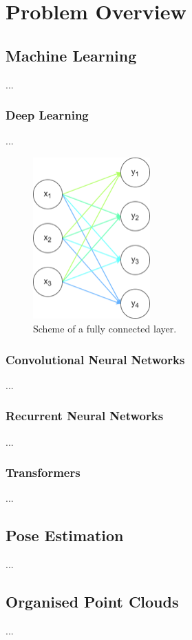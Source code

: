 \chapter{Problem Overview}
\label{chap:overwiev}

\section{Machine Learning}
...

\subsection{Deep Learning}
...

\begin{figure}
\centerline{\includegraphics[width=0.4\textwidth]{images/fcl}}
\caption[Fully connected layer]{Scheme of a fully connected layer.}
\end{figure}


\subsection{Convolutional Neural Networks}
...

\subsection{Recurrent Neural Networks}
...

\subsection{Transformers}
...

\section{Pose Estimation}
...

\section{Organised Point Clouds}
...
